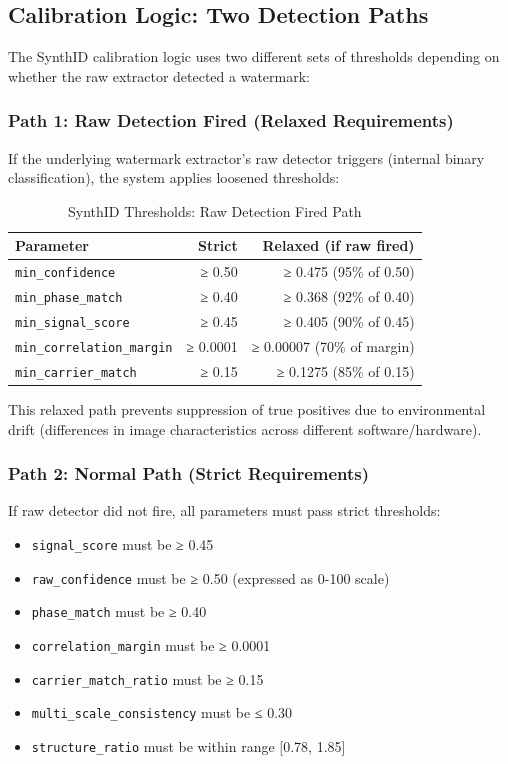 \documentclass[12pt,a4paper]{book}
\begin{document}
\subsection{Calibration Logic: Two Detection Paths}

The SynthID calibration logic uses two different sets of thresholds depending on whether the raw extractor detected a watermark:

\subsubsection{Path 1: Raw Detection Fired (Relaxed Requirements)}
If the underlying watermark extractor's raw detector triggers (internal binary classification), the system applies loosened thresholds:

\begin{table}[H]
\centering
\captionsetup{justification=centering}
\caption{SynthID Thresholds: Raw Detection Fired Path}
\begin{tabular}{|l|r|r|}
\hline
\textbf{Parameter} & \textbf{Strict} & \textbf{Relaxed (if raw fired)} \\
\hline
\texttt{min\_confidence} & ≥ 0.50 & ≥ 0.475 (95\% of 0.50) \\
\hline
\texttt{min\_phase\_match} & ≥ 0.40 & ≥ 0.368 (92\% of 0.40) \\
\hline
\texttt{min\_signal\_score} & ≥ 0.45 & ≥ 0.405 (90\% of 0.45) \\
\hline
\texttt{min\_correlation\_margin} & ≥ 0.0001 & ≥ 0.00007 (70\% of margin) \\
\hline
\texttt{min\_carrier\_match} & ≥ 0.15 & ≥ 0.1275 (85\% of 0.15) \\
\hline
\end{tabular}
\end{table}

This relaxed path prevents suppression of true positives due to environmental drift (differences in image characteristics across different software/hardware).

\subsubsection{Path 2: Normal Path (Strict Requirements)}
If raw detector did not fire, all parameters must pass strict thresholds:
\begin{itemize}
    \item \texttt{signal\_score} must be ≥ 0.45
    \item \texttt{raw\_confidence} must be ≥ 0.50 (expressed as 0-100 scale)
    \item \texttt{phase\_match} must be ≥ 0.40
    \item \texttt{correlation\_margin} must be ≥ 0.0001
    \item \texttt{carrier\_match\_ratio} must be ≥ 0.15
    \item \texttt{multi\_scale\_consistency} must be ≤ 0.30
    \item \texttt{structure\_ratio} must be within range [0.78, 1.85]
\end{itemize}
\end{document}
